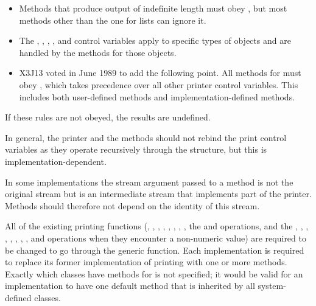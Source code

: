 \begin{defun}
\begin{itemize}
\item 
Methods that produce output of indefinite length must obey
, but most methods other than the one for lists can
ignore it.

\item 
The , , , 
, and  control variables apply
to specific types of objects and are handled by the methods for those
objects.

\item X3J13 voted in June 1989  to add the following point.
   All methods for  must obey ,
   which takes precedence over all other printer control variables.  This
   includes both user-defined methods and implementation-defined methods.
\end{itemize}

If these rules are not obeyed, the results are undefined.

In general, the printer and the  methods should not
rebind the print control variables as they operate recursively through the
structure, but this is implementation-dependent.

In some implementations the stream argument passed to a 
 method is not the original stream but is an
intermediate stream that implements part of the printer.  Methods
should therefore not depend on the identity of this stream.

All of the existing printing functions (, , 
, , , , 
, , the  and 
  operations, and the , ,
, , , \cd{{\Xtilde}\$}, 
, , and   operations when they
encounter a non-numeric value) are required to be changed to go
through the  generic function.  Each implementation is
required to replace its former implementation of printing with one or
more  methods.  Exactly which classes have methods for
 is not specified; it would be valid for an implementation
to have one default method that is inherited by all system-defined
classes.

\end{defun}



